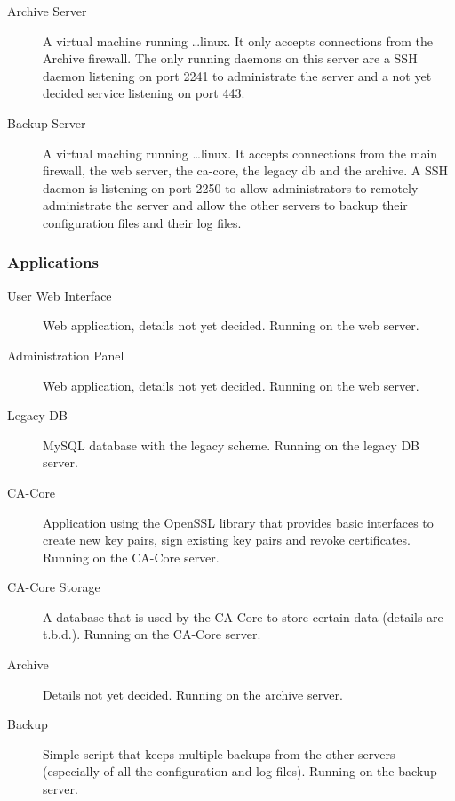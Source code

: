 \documentclass{article}
\begin{document}
\begin{description}
\item[Archive Server] A virtual machine running \dots linux. It only accepts connections from the Archive firewall. The only running daemons on this server are a SSH daemon listening on port 2241 to administrate the server and a not yet decided service listening on port 443.

\item[Backup Server] A virtual maching running \dots linux. It accepts connections from the main firewall, the web server, the ca-core, the legacy db and the archive. A SSH daemon is listening on port 2250 to allow administrators to remotely administrate the server and allow the other servers to backup their configuration files and their log files.

\end{description}

\subsubsection{Applications}

\begin{description}

\item[User Web Interface] Web application, details not yet decided. Running on the web server.

\item[Administration Panel] Web application, details not yet decided. Running on the web server.

\item[Legacy DB] MySQL database with the legacy scheme. Running on the legacy DB server.

\item[CA-Core] Application using the OpenSSL library that provides basic interfaces to create new key pairs, sign existing key pairs and revoke certificates. Running on the CA-Core server.

\item[CA-Core Storage] A database that is used by the CA-Core to store certain data (details are t.b.d.). Running on the CA-Core server.

\item[Archive] Details not yet decided. Running on the archive server.

\item[Backup] Simple script that keeps multiple backups from the other servers (especially of all the configuration and log files). Running on the backup server.

\end{description}
\end{document}
